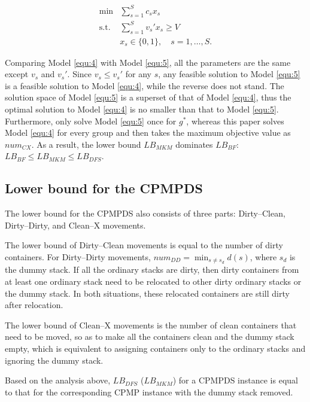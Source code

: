 \documentclass[review,3p,times,authoryear,12pt]{elsarticle}
\begin{document}
\begin{equation}
\label{equ:5}
\begin{array}{rl}
\min & \sum_{s=1}^S c_s x_s\\
\mathrm{s.t.} &\sum_{s=1}^S v_s' x_s\ge V\\
&x_s\in\{0,1\}, \quad s=1,\dots,S\textrm{.}
\end{array}
\end{equation}

Comparing Model \ref{equ:4} with Model \ref{equ:5}, all the parameters are the same except $v_s$ and $v_s'$.
Since $v_s\le v_s'$ for any $s$, any feasible solution to Model \ref{equ:5} is a feasible solution to Model \ref{equ:4}, while the reverse does not stand.
The solution space of Model \ref{equ:5} is a superset of that of Model \ref{equ:4}, thus the optimal solution to Model \ref{equ:4} is no smaller than that to Model \ref{equ:5}.
Furthermore, \cite{BF2012} only solve Model \ref{equ:5} once for $g^*$, whereas this paper solves Model \ref{equ:4} for every group and then takes the maximum objective value as $\mathit{num}_\mathit{CX}$.
As a result, the lower bound $\mathit{LB}_\mathit{MKM}$ dominates $\mathit{LB}_\mathit{BF}$: $\mathit{LB}_\mathit{BF}\le \mathit{LB}_\mathit{MKM}\le \mathit{LB}_\mathit{DFS}$.

\subsection{Lower bound for the CPMPDS}


The lower bound for the CPMPDS also consists of three parts: Dirty--Clean, Dirty--Dirty, and Clean--X movements.

The lower bound of Dirty--Clean movements is equal to the number of dirty containers.
For Dirty--Dirty movements, $\mathit{num}_\mathit{DD}=\min_{s\neq s_d} d(s)$, where $s_d$ is the dummy stack.
If all the ordinary stacks are dirty, then dirty containers from at least one ordinary stack need to be relocated to other dirty ordinary stacks or the dummy stack.
In both situations, these relocated containers are still dirty after relocation.

The lower bound of Clean--X movements is the number of clean containers that need to be moved, so as to make all the containers clean and the dummy stack empty, which is equivalent to assigning containers only to the ordinary stacks and ignoring the dummy stack.

Based on the analysis above, $\mathit{LB}_\mathit{DFS}$ ($\mathit{LB}_\mathit{MKM}$) for a CPMPDS instance is equal to that for the corresponding CPMP instance with the dummy stack removed.
\end{document}
